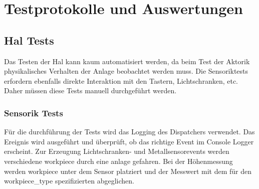 \section{Testprotokolle und Auswertungen}\label{sec:testprotokolle-und-auswertungen}


\subsection{Hal Tests}\label{subsec:hal-tests}

Das Testen der Hal kann kaum automatisiert werden, da beim Test der Aktorik physikalisches Verhalten der Anlage beobachtet werden muss.
Die Sensoriktests erfordern ebenfalls direkte Interaktion mit den Tastern, Lichtschranken, etc.
Daher müssen diese Tests manuell durchgeführt werden. 

\subsubsection{Sensorik Tests}\label{subsubsec:sensorik-tests}
Für die durchführung der Tests wird das Logging des Dispatchers verwendet.
Das Ereignis wird ausgeführt und überprüft, ob das richtige Event im Console Logger erscheint.
Zur Erzeugung Lichtschranken- und Metallsensorevents werden verschiedene \gls{workpiece} durch eine \gls{anlage} gefahren.
Bei der Höhenmessung werden \gls{workpiece} unter dem Sensor platziert und der Messwert mit dem für den \gls{workpiece_type}
spezifizierten abgeglichen.

